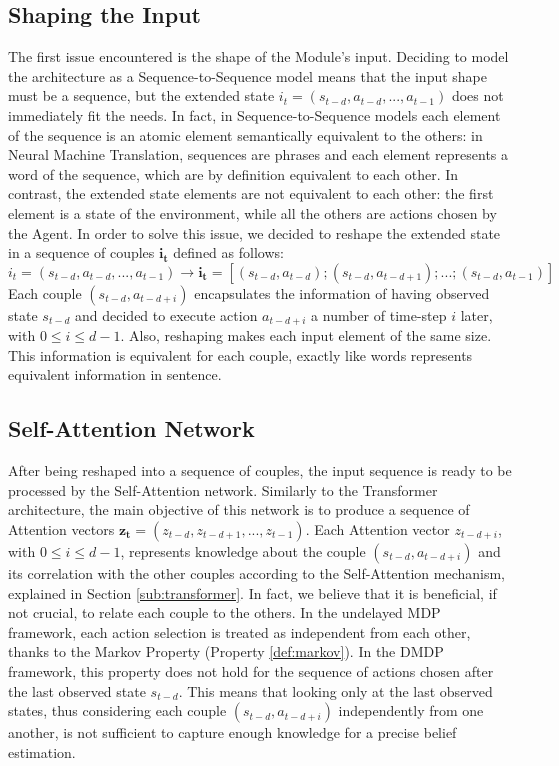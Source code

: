         \subsection{Shaping the Input}
            \label{sub:shape_input}
            The first issue encountered is the shape of the Module's input. Deciding to model the architecture as a Sequence-to-Sequence model means that the input shape must be a sequence, but the extended state $i_t = (s_{t-d}, a_{t-d}, ..., a_{t-1})$ does not immediately fit the needs. In fact, in Sequence-to-Sequence models each element of the sequence is an atomic element semantically equivalent to the others: in Neural Machine Translation, sequences are phrases and each element represents a word of the sequence, which are by definition equivalent to each other. In contrast, the extended state elements are not equivalent to each other: the first element is a state of the environment, while all the others are actions chosen by the Agent. In order to solve this issue, we decided to reshape the extended state in a sequence of couples $\mathbf{i_t}$ defined as follows:
            \[ i_t = (s_{t-d}, a_{t-d}, ..., a_{t-1}) \rightarrow \mathbf{i_t} =  \left[ (s_{t-d}, a_{t-d});  (s_{t-d}, a_{t-d+1}); ... ; (s_{t-d}, a_{t-1}) \right] \]
            Each couple $(s_{t-d}, a_{t-d+i})$ encapsulates the information of having observed state $s_{t-d}$ and decided to execute action $a_{t-d+i}$ a number of time-step $i$ later, with $0 \leq i \leq d - 1$. Also, reshaping makes each input element of the same size. This information is equivalent for each couple, exactly like words represents equivalent information in sentence.
            
        \subsection{Self-Attention Network}
            \label{sub:selfan}
            After being reshaped into a sequence of couples, the input sequence is ready to be processed by the Self-Attention network. Similarly to the Transformer architecture, the main objective of this network is to produce a sequence of Attention vectors $\mathbf{z_t} = (z_{t-d}, z_{t-d+1}, ..., z_{t-1})$. Each Attention vector $z_{t-d+i}$, with $0 \leq i \leq d-1$, represents knowledge about the couple $(s_{t-d}, a_{t-d+i})$ and its correlation with the other couples according to the Self-Attention mechanism, explained in Section \ref{sub:transformer}. In fact, we believe that it is beneficial, if not crucial, to relate each couple to the others. In the undelayed MDP framework, each action selection is treated as independent from each other, thanks to the Markov Property (Property \ref{def:markov}). In the DMDP framework, this property does not hold for the sequence of actions chosen after the last observed state $s_{t-d}$. This means that looking only at the last observed states, thus considering each couple $(s_{t-d}, a_{t-d+i})$ independently from one another, is not sufficient to capture enough knowledge for a precise belief estimation.
            
